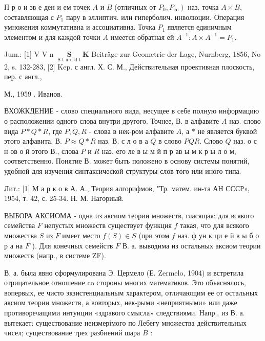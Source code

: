 \documentclass[10pt]{article}
\begin{document}
П р о и зв е ден и ем точек $A$ и $B$ (отличных от $\left.P_{0}, P_{\infty}\right)$ наз. точка $A \times B$, составляющая с $P_{1}$ пару в эллиптич. или гиперболич. инволюции. Операция умножения коммутативна и ассоциативна. Точка $P_{1}$ является единичным элементом и для каждой точки $A$ имеется обратная ей $A^{-1}: A \times A^{-1}=P_{1}$.



Jum.: [1] V V n $\underset{\text { S t a u d t }}{\mathbf{S}} \mathbf{K}$ Beiträge zur Geometrie der Lage, Nurnberg, 1856, No 2, s. 132-283, [2] Kep. с англ. Х. С. М., Действительная проективная плоскость, пер. с англ.,

М., 1959 . Иванов.



ВХОЖКДЕНИЕ - слово специального вида, несущее в себе полную информацию о расположении одного слова внутри другого. Точнее, В. в алфавите $A$ наз. слово вида $P * Q * R$, где $P, Q, R$ - слова в нек-ром алфавите $A$, а $*$ не является буквой этого алфавита. В. $P \approx Q * R$ наз. В. с л о в а $Q$ в слово $P Q R$. Слово $Q$ наз. о с н ов о й этого В., слова $P$ и $R$ наз. его ле в ы м й п р ав ы м к р ы л о м, соответственно. Понятие В. может быть положено в основу системы понятий, удобной для изучения синтаксической структуры слов того или иного типа.



Лит.: [1] М а р к о в А. А., Теория алгорифмов, "Тр. матем. ин-та АН СССР», 1954, т. 42, с. 25-34. Н. М. Нагориый.



ВЫБОРА АКСИОМА - одна из аксиом теории множеств, гласящая: для всякого семейства $F$ непустых множеств существует функция $f$ такая, что для всякого множества $S$ из $F$ имеет место $f(S) \in S$ (при этом $f$ наз. ф ун к ци е й в ы б о р а на $F$ ). Для конечных семейств $F$ В. а. выводима из остальных аксиом теории множеств (напр., в системе ZF).



В. а. была явно сформулирована Э. Цермело (Е. Zermelo, 1904) и встретила отрицательное отношение co стороны многих математиков. Это объяснялось, вопервых, ее чисто экзистенциальным характером, отличающим ее от остальных аксиом теории множеств, а вовторых, нек-рыми «неприятными» или даже противоречащими интуиции «здравого смысла» следствиями. Напр., из В. а. вытекает: существование неизмерімого по Лебегу множества действительных чисел; существование трех разбиений шара $B$ :
\end{document}
